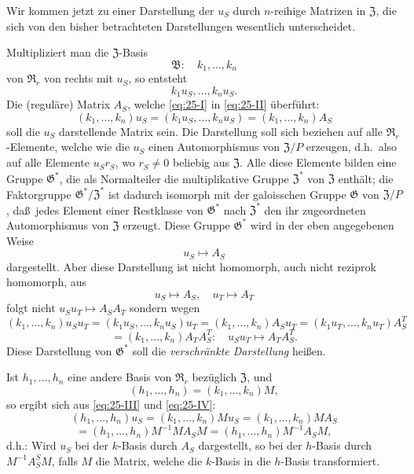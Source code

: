 \documentclass[12pt,a4paper]{article}
\theoremstyle{plain}
\theoremstyle{definition}
\theoremstyle{remark}
\begin{document}
Wir kommen jetzt zu einer Darstellung der $u_{S}$ durch $n$-reihige
Matrizen in $\mathfrak{Z}$, die sich von den bisher betrachteten Darstellungen
wesentlich unterscheidet.

Multipliziert man die $\mathfrak{Z}$-Basis
\begin{equation}\label{eq:25-I}
\mathfrak{B}: \quad k_{1}, \ldots, k_{n}
\end{equation}
von $\mathfrak{R}_{r}$ von rechts mit $u_{S}$, so entsteht
\begin{equation}\label{eq:25-II}
k_{1}u_{S}, \ldots, k_{n}u_{S}.
\end{equation}
Die (regul\"are) Matrix $A_{S}$, welche \eqref{eq:25-I} in \eqref{eq:25-II} \"uberf\"uhrt:
\begin{equation}\label{eq:25-III}
(k_{1}, \ldots, k_{n})u_{S} = (k_{1}u_{S}, \ldots, k_{n}u_{S}) = (k_{1}, \ldots, k_{n})A_{S}
\end{equation}
soll die $u_{S}$ darstellende Matrix sein. Die Darstellung soll sich beziehen
auf alle $\mathfrak{R}_{r}$-Elemente, welche wie die $u_{S}$ einen Automorphismus von
$\mathfrak{Z}/P$ erzeugen, d.h.\ also auf alle Elemente $u_{S}r_{S}$, wo
$r_{S} \neq 0$ beliebig aus $\mathfrak{Z}$. Alle diese Elemente bilden eine Gruppe
$\mathfrak{G}^{*}$, die als Normalteiler die multiplikative Gruppe $\mathfrak{Z}^{*}$ von $\mathfrak{Z}$
enth\"alt; die Faktorgruppe $\mathfrak{G}^{*}/\mathfrak{Z}^{*}$ ist dadurch isomorph mit der
galoisschen Gruppe $\mathfrak{G}$ von $\mathfrak{Z}/P$, da\ss\ jedes Element einer Restklasse
von $\mathfrak{G}^{*}$ nach $\mathfrak{Z}^{*}$ den ihr zugeordneten Automorphismus von $\mathfrak{Z}$
erzeugt. Diese Gruppe $\mathfrak{G}^{*}$ wird in der eben angegebenen Weise
\[
u_{S} \mapsto A_{S}
\]
dargestellt. Aber diese Darstellung ist nicht homomorph, auch nicht
reziprok homomorph, aus
\[
u_{S} \mapsto A_{S}, \quad u_{T} \mapsto A_{T}
\]
folgt nicht $u_{S}u_{T} \mapsto A_{S}A_{T}$ sondern wegen
\[
(k_{1}, \ldots, k_{n})u_{S}u_{T} = (k_{1}u_{S}, \ldots, k_{n}u_{S})u_{T}
= (k_{1}, \ldots, k_{n})A_{S}u_{T} = (k_{1}u_{T}, \ldots, k_{n}u_{T})A_{S}^{T}
\]
\[
= (k_{1}, \ldots, k_{n})A_{T}A_{S}^{T}: \quad u_{S}u_{T} \mapsto A_{T}A_{S}^{T}.
\]
Diese Darstellung von $\mathfrak{G}^{*}$ soll die \textit{verschr\"ankte Darstellung} hei\ss en.

Ist $h_{1}, \ldots, h_{n}$ eine andere Basis von $\mathfrak{R}_{r}$ bez\"uglich $\mathfrak{Z}$, und
\begin{equation}\label{eq:25-IV}
(h_{1}, \ldots, h_{n}) = (k_{1}, \ldots, k_{n})M,
\end{equation}
so ergibt sich aus \eqref{eq:25-III} und \eqref{eq:25-IV}:
\[
(h_{1}, \ldots, h_{n})u_{S} = (k_{1}, \ldots, k_{n})Mu_{S} = (k_{1}, \ldots, k_{n})MA_{S}
\]
\[
= (h_{1}, \ldots, h_{n})M^{-1}MA_{S}M = (h_{1}, \ldots, h_{n})M^{-1}A_{S}M,
\]
d.h.: Wird $u_{S}$ bei der $k$-Basis durch $A_{S}$ dargestellt, so bei der
$h$-Basis durch $M^{-1}A_{S}^{S}M$, falls $M$ die Matrix, welche die
$k$-Basis in die $h$-Basis transformiert.
\end{document}

